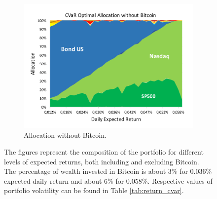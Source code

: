 \begin{figure}
	\begin{subfigure}{0.8\textwidth}
		\centering
		\includegraphics[width=\linewidth]{Images/cvar_allocation_no_btc}
		\caption{Allocation without Bitcoin.}
	\end{subfigure}
	\caption[CVaR Optimal Allocations]{The figures represent the composition of the portfolio for different levels of expected returns, both including and excluding Bitcoin.  The percentage of wealth invested in Bitcoin is about 3\%  for  0.036\% expected daily return and  about 6\% for 0.058\%. Respective values of portfolio volatility can be found in Table \ref{tab:return_cvar}.}
	\label{fig:markowitz_allocation}
\end{figure}
